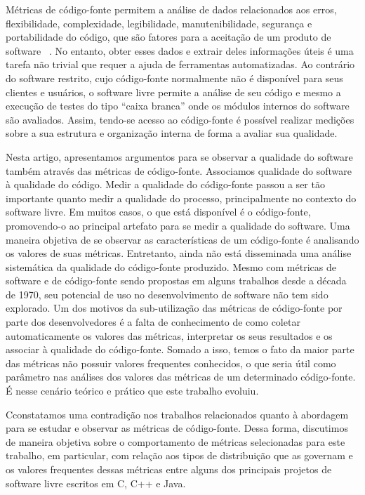 \documentclass{llncs}
\begin{document}
Métricas de código-fonte permitem a análise de dados relacionados aos erros,
flexibilidade, complexidade, legibilidade, manutenibilidade, segurança e
portabilidade do código, que são fatores para a aceitação de um produto de
software ~\cite{Henderson-Sellers96,Sato07}.
%
No entanto, obter esses dados e extrair deles informações úteis é uma tarefa
não trivial que requer a ajuda de ferramentas automatizadas.
%
Ao contrário do software restrito, cujo código-fonte normalmente não é
disponível para seus clientes e usuários, o software livre permite a análise de
seu código e  mesmo a execução de testes do tipo ``caixa branca'' onde os
módulos internos do software são avaliados.
%
Assim, tendo-se acesso ao código-fonte é possível realizar medições sobre a sua
estrutura e organização interna de forma a avaliar sua qualidade.

Nesta artigo, apresentamos argumentos para se observar a qualidade do software
também através das métricas de código-fonte.
%
Associamos qualidade do software à qualidade do código. Medir a qualidade do
código-fonte passou a ser tão importante quanto medir a qualidade do processo,
principalmente no contexto do software livre.
%
Em muitos casos, o que está disponível é o código-fonte, promovendo-o ao
principal artefato para se medir a qualidade do software. Uma maneira objetiva
de se observar as ca\-rac\-te\-rís\-ti\-cas de um código-fonte é analisando os
valores de suas métricas. 
%
Entretanto, ainda não está disseminada uma análise sistemática da qualidade do
código-fonte produzido.
%
Mesmo com métricas de software e de código-fonte sendo propostas em alguns
trabalhos desde a década de 1970, seu potencial de uso no desenvolvimento de
software não tem sido explorado.
%
Um dos motivos da sub-utilização das métricas de código-fonte por parte dos
desenvolvedores é a falta de conhecimento de como coletar automaticamente os
valores das métricas, interpretar os seus resultados e os associar à qualidade
do código-fonte.
%
Somado a isso, temos o fato da maior parte das métricas não possuir valores
frequentes conhecidos, o que seria útil como parâmetro nas análises dos valores
das métricas de um determinado código-fonte.
%
É nesse cenário teórico e prático que este trabalho evoluiu.

Cconstatamos uma contradição nos trabalhos relacionados quanto à abordagem para
se estudar e observar as métricas de código-fonte.
%
Dessa forma, discutimos de maneira objetiva sobre o comportamento de métricas
selecionadas para este trabalho, em particular, com relação aos tipos de
distribuição que as governam e os valores frequentes dessas métricas entre
alguns dos principais projetos de software livre escritos em C,  C++ e Java.
\end{document}
